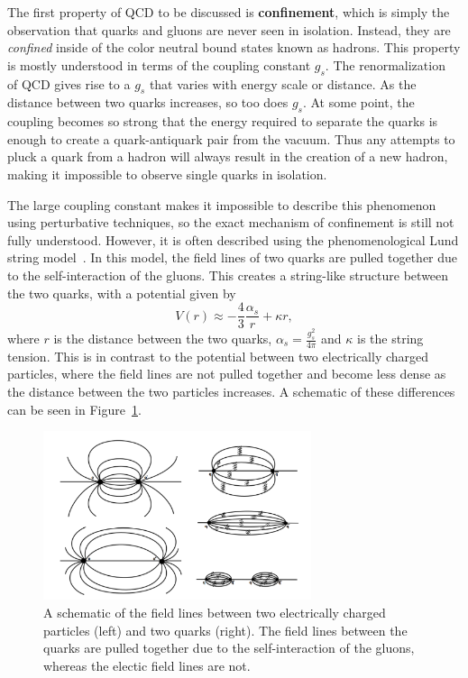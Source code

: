 The first property of QCD to be discussed is \textbf{confinement}, which is simply the observation that quarks and gluons are never seen in isolation. Instead, they are \textit{confined} inside of the color neutral bound states known as hadrons. This property is mostly understood in terms of the coupling constant $g_{s}$. The renormalization~\cite{QCDRenorm} of QCD gives rise to a $g_{s}$ that varies with energy scale or distance. As the distance between two quarks increases, so too does $g_{s}$. At some point, the coupling becomes so strong that the energy required to separate the quarks is enough to create a quark-antiquark pair from the vacuum. Thus any attempts to pluck a quark from a hadron will always result in the creation of a new hadron, making it impossible to observe single quarks in isolation. 

The large coupling constant makes it impossible to describe this phenomenon using perturbative techniques, so the exact mechanism of confinement is still not fully understood. However, it is often described using the phenomenological Lund string model~\cite{LundString}. In this model, the field lines of two quarks are pulled together due to the self-interaction of the gluons. This creates a string-like structure between the two quarks, with a potential given by 
%
\begin{equation}
    \label{eq:lund_potential}
    V(r) \approx -\frac{4}{3}\frac{\alpha_s}{r} + \kappa r,
\end{equation}
%
where $r$ is the distance between the two quarks, $\alpha_s = \frac{g_s^2}{4\pi}$ and $\kappa$ is the string tension. This is in contrast to the potential between two electrically charged particles, where the field lines are not pulled together and become less dense as the distance between the two particles increases. A schematic of these differences can be seen in Figure~\ref{fig:field_line_differences}.

\begin{figure}[ht]
    \centering
    \includegraphics[width=0.7\textwidth]{figures/introduction/electric_color_fields.png}
    \caption{A schematic of the field lines between two electrically charged particles (left) and two quarks (right). The field lines between the quarks are pulled together due to the self-interaction of the gluons, whereas the electic field lines are not.}
    \label{fig:field_line_differences}
\end{figure}

